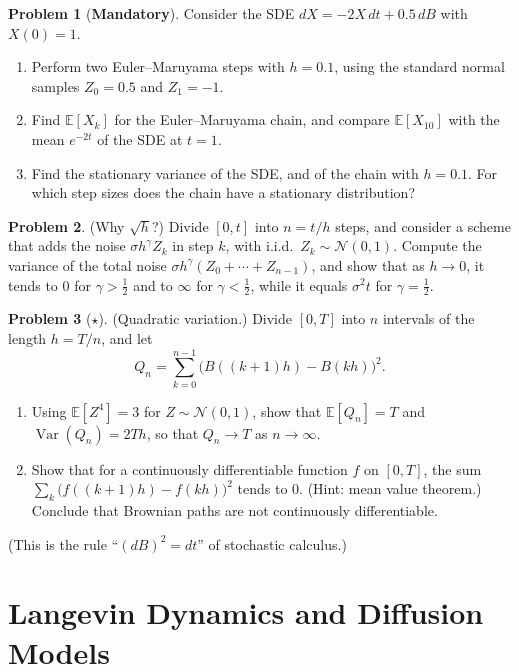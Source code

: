 \documentclass[11pt]{article}
\theoremstyle{definition}
\newtheorem{problem}{Problem}[section]
\newcommand{\mandatory}{\textcolor{red!70!black}{\textbf{Mandatory}}}
\newcommand{\E}{\mathbb{E}}
\DeclareMathOperator{\Var}{Var}
\begin{document}
\begin{problem}[\mandatory]\label{pr:euler-maruyama}
    Consider the SDE $dX = -2X\,dt + 0.5\,dB$ with $X(0) = 1$.
    \begin{enumerate}[label=(\alph*)]
        \item Perform two Euler--Maruyama steps with $h = 0.1$, using the standard normal samples $Z_0 = 0.5$ and $Z_1 = -1$.
        \item Find $\E[X_k]$ for the Euler--Maruyama chain, and compare $\E[X_{10}]$ with the mean $e^{-2t}$ of the SDE at $t = 1$.
        \item Find the stationary variance of the SDE, and of the chain with $h = 0.1$. For which step sizes does the chain have a stationary distribution?
    \end{enumerate}
\end{problem}

\begin{problem}\label{pr:sqrt-h}
    (Why $\sqrt{h}$?) Divide $[0, t]$ into $n = t/h$ steps, and consider a scheme that adds the noise $\sigma h^\gamma Z_k$ in step $k$, with i.i.d.\ $Z_k \sim \mathcal{N}(0, 1)$. Compute the variance of the total noise $\sigma h^\gamma(Z_0 + \cdots + Z_{n-1})$, and show that as $h \to 0$, it tends to $0$ for $\gamma > \frac{1}{2}$ and to $\infty$ for $\gamma < \frac{1}{2}$, while it equals $\sigma^2t$ for $\gamma = \frac{1}{2}$.
\end{problem}

\begin{problem}[$\star$]\label{pr:quadratic-variation}
    (Quadratic variation.) Divide $[0, T]$ into $n$ intervals of the length $h = T/n$, and let
    \[Q_n = \sum_{k=0}^{n-1}\big(B((k + 1)h) - B(kh)\big)^2.\]
    \begin{enumerate}[label=(\alph*)]
        \item Using $\E[Z^4] = 3$ for $Z \sim \mathcal{N}(0, 1)$, show that $\E[Q_n] = T$ and $\Var(Q_n) = 2Th$, so that $Q_n \to T$ as $n \to \infty$.
        \item Show that for a continuously differentiable function $f$ on $[0, T]$, the sum $\sum_k \big(f((k + 1)h) - f(kh)\big)^2$ tends to $0$. (Hint: mean value theorem.) Conclude that Brownian paths are not continuously differentiable.
    \end{enumerate}
    (This is the rule ``$(dB)^2 = dt$'' of stochastic calculus.)
\end{problem}

\section{Langevin Dynamics and Diffusion Models}
\end{document}
